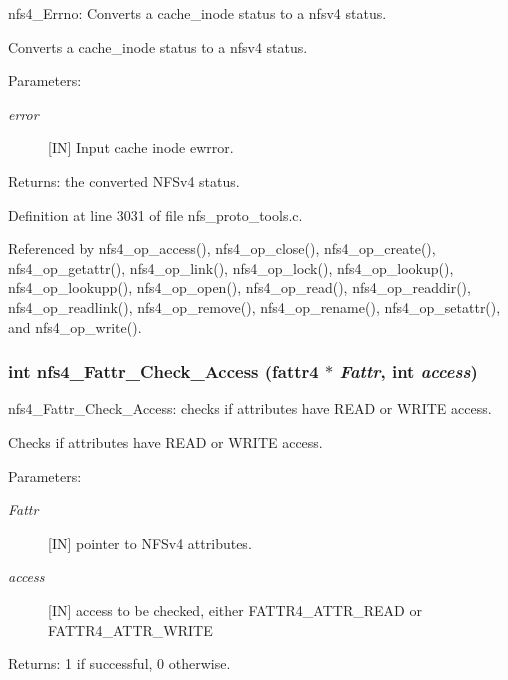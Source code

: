 nfs4\_\-Errno: Converts a cache\_\-inode status to a nfsv4 status.

Converts a cache\_\-inode status to a nfsv4 status.

\begin{Desc}
\item[Parameters:]
\begin{description}
\item[{\em error}][IN] Input cache inode ewrror.\end{description}
\end{Desc}
\begin{Desc}
\item[Returns:]the converted NFSv4 status. \end{Desc}


Definition at line 3031 of file nfs\_\-proto\_\-tools.c.

Referenced by nfs4\_\-op\_\-access(), nfs4\_\-op\_\-close(), nfs4\_\-op\_\-create(), nfs4\_\-op\_\-getattr(), nfs4\_\-op\_\-link(), nfs4\_\-op\_\-lock(), nfs4\_\-op\_\-lookup(), nfs4\_\-op\_\-lookupp(), nfs4\_\-op\_\-open(), nfs4\_\-op\_\-read(), nfs4\_\-op\_\-readdir(), nfs4\_\-op\_\-readlink(), nfs4\_\-op\_\-remove(), nfs4\_\-op\_\-rename(), nfs4\_\-op\_\-setattr(), and nfs4\_\-op\_\-write().
\subsubsection{\setlength{\rightskip}{0pt plus 5cm}int nfs4\_\-Fattr\_\-Check\_\-Access (fattr4 $\ast$ {\em Fattr}, int {\em access})}\label{nfs__proto__tools_8c_a20}


nfs4\_\-Fattr\_\-Check\_\-Access: checks if attributes have READ or WRITE access.

Checks if attributes have READ or WRITE access.

\begin{Desc}
\item[Parameters:]
\begin{description}
\item[{\em Fattr}][IN] pointer to NFSv4 attributes. \item[{\em access}][IN] access to be checked, either FATTR4\_\-ATTR\_\-READ or FATTR4\_\-ATTR\_\-WRITE\end{description}
\end{Desc}
\begin{Desc}
\item[Returns:]1 if successful, 0 otherwise. \end{Desc}


